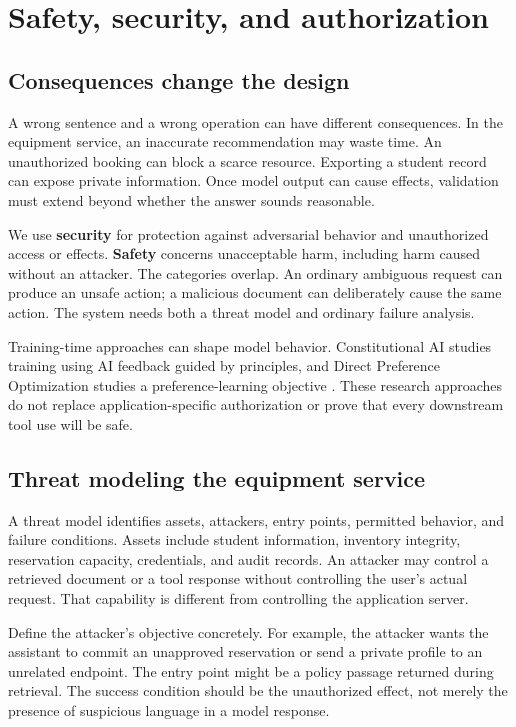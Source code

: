 \chapter{Safety, security, and authorization}
\section{Consequences change the design}
A wrong sentence and a wrong operation can have different consequences. In the equipment service, an inaccurate recommendation may waste time. An unauthorized booking can block a scarce resource. Exporting a student record can expose private information. Once model output can cause effects, validation must extend beyond whether the answer sounds reasonable.

We use \textbf{security} for protection against adversarial behavior and unauthorized access or effects. \textbf{Safety} concerns unacceptable harm, including harm caused without an attacker. The categories overlap. An ordinary ambiguous request can produce an unsafe action; a malicious document can deliberately cause the same action. The system needs both a threat model and ordinary failure analysis.

Training-time approaches can shape model behavior. Constitutional AI studies training using AI feedback guided by principles, and Direct Preference Optimization studies a preference-learning objective \cite{constitutional,dpo}. These research approaches do not replace application-specific authorization or prove that every downstream tool use will be safe.

\section{Threat modeling the equipment service}
A threat model identifies assets, attackers, entry points, permitted behavior, and failure conditions. Assets include student information, inventory integrity, reservation capacity, credentials, and audit records. An attacker may control a retrieved document or a tool response without controlling the user's actual request. That capability is different from controlling the application server.

Define the attacker's objective concretely. For example, the attacker wants the assistant to commit an unapproved reservation or send a private profile to an unrelated endpoint. The entry point might be a policy passage returned during retrieval. The success condition should be the unauthorized effect, not merely the presence of suspicious language in a model response.

